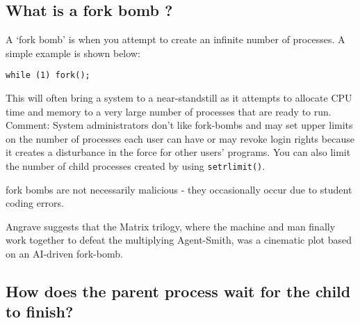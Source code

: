 \begin{Shaded}
\begin{Highlighting}[]
 \NormalTok{); }
 \NormalTok{)}
\NormalTok{\{ }
\NormalTok{\} } \NormalTok{\{ }
\NormalTok{\}}
\end{Highlighting}
\end{Shaded}

\subsection{What is a fork bomb ?}\label{what-is-a-fork-bomb}

A `fork bomb' is when you attempt to create an infinite number of
processes. A simple example is shown below:

\begin{verbatim}
while (1) fork();
\end{verbatim}

This will often bring a system to a near-standstill as it attempts to
allocate CPU time and memory to a very large number of processes that
are ready to run. Comment: System administrators don't like fork-bombs
and may set upper limits on the number of processes each user can have
or may revoke login rights because it creates a disturbance in the force
for other users' programs. You can also limit the number of child
processes created by using \texttt{setrlimit()}.

fork bombs are not necessarily malicious - they occasionally occur due
to student coding errors.

Angrave suggests that the Matrix trilogy, where the machine and man
finally work together to defeat the multiplying Agent-Smith, was a
cinematic plot based on an AI-driven fork-bomb.

\subsection{How does the parent process wait for the child to
finish?}\label{how-does-the-parent-process-wait-for-the-child-to-finish}

